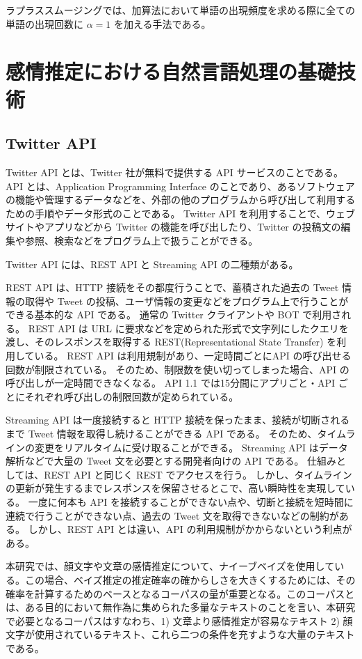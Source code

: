 \documentclass[11pt,a4j]{jsarticle}
\begin{document}
ラプラススムージングでは、加算法において単語の出現頻度を求める際に全ての単語の出現回数に $\alpha=1$ を加える手法である。
 
\section{感情推定における自然言語処理の基礎技術}
\subsection{Twitter API}
 Twitter API とは、Twitter 社が無料で提供する API サービスのことである。
API とは、Application Programming Interface のことであり、あるソフトウェアの機能や管理するデータなどを、外部の他のプログラムから呼び出して利用するための手順やデータ形式のことである。
Twitter API を利用することで、ウェブサイトやアプリなどから Twitter の機能を呼び出したり、Twitter の投稿文の編集や参照、検索などをプログラム上で扱うことができる。

Twitter API には、REST API と Streaming API の二種類がある。

REST API は、HTTP 接続をその都度行うことで、蓄積された過去の Tweet 情報の取得や Tweet の投稿、ユーザ情報の変更などをプログラム上で行うことができる基本的な API である。
通常の Twitter クライアントや BOT で利用される。
REST API は URL に要求などを定められた形式で文字列にしたクエリを渡し、そのレスポンスを取得する REST(Representational State Transfer) を利用している。
REST API は利用規制があり、一定時間ごとにAPI の呼び出せる回数が制限されている。
そのため、制限数を使い切ってしまった場合、API の呼び出しが一定時間できなくなる。
API 1.1 では15分間にアプリごと・API ごとにそれぞれ呼び出しの制限回数が定められている。

Streaming API は一度接続すると HTTP 接続を保ったまま、接続が切断されるまで Tweet 情報を取得し続けることができる API である。
そのため、タイムラインの変更をリアルタイムに受け取ることができる。
Streaming API はデータ解析などで大量の Tweet 文を必要とする開発者向けの API である。
仕組みとしては、REST API と同じく REST でアクセスを行う。
しかし、タイムラインの更新が発生するまでレスポンスを保留させるとこで、高い瞬時性を実現している。
一度に何本も API を接続することができない点や、切断と接続を短時間に連続で行うことができない点、過去の Tweet 文を取得できないなどの制約がある。
しかし、REST API とは違い、API の利用規制がかからないという利点がある。

本研究では、顔文字や文章の感情推定について、ナイーブベイズを使用している。この場合、ベイズ推定の推定確率の確からしさを大きくするためには、その確率を計算するためのベースとなるコーパスの量が重要となる。このコーパスとは、ある目的において無作為に集められた多量なテキストのことを言い、本研究で必要となるコーパスはすなわち、1) 文章より感情推定が容易なテキスト 2) 顔文字が使用されているテキスト、これら二つの条件を充すような大量のテキストである。
\end{document}
